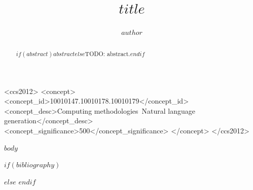 \documentclass[sigconf,nonacm,review=false]{acmart}
\title{$title$}
\author{$author$}
\affiliation{%
  \institution{TODO: Institution}%
  \city{TODO}%
  \country{TODO}%
}
\begin{document}
\begin{abstract}
$if(abstract)$$abstract$$else$TODO: abstract.$endif$
\end{abstract}

\begin{CCSXML}
<ccs2012>
  <concept>
    <concept_id>10010147.10010178.10010179</concept_id>
    <concept_desc>Computing methodologies~Natural language generation</concept_desc>
    <concept_significance>500</concept_significance>
  </concept>
</ccs2012>
\end{CCSXML}


\maketitle

$body$

$if(bibliography)$

$else$
% 
$endif$
\end{document}
